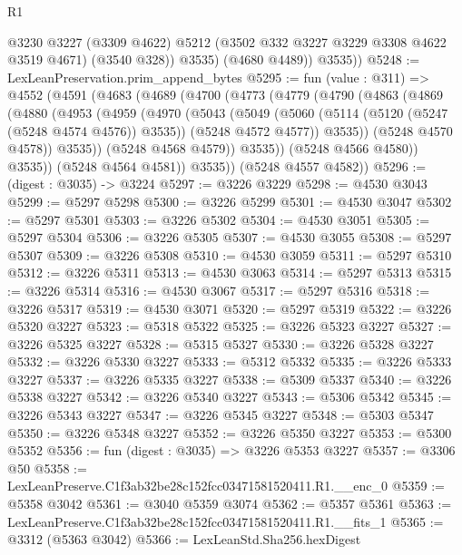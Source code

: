 \begin{lexlean}{R1}
\begin{coremodule}
              @3230
              @3227
              (@3309 @4622)
              @5212
              (@3502 @332 @3227 @3229 @3308 @4622 @3519 @4671)
              (@3540 @328))
            @3535)
          (@4680 @4489))
        @3535))
@5248 := LexLeanPreservation.prim_append_bytes
@5295 := fun (value : @311) =>
  @4552
    (@4591
      (@4683
        (@4689
          (@4700
            (@4773
              (@4779
                (@4790
                  (@4863
                    (@4869
                      (@4880
                        (@4953
                          (@4959
                            (@4970
                              (@5043
                                (@5049
                                  (@5060
                                    (@5114 (@5120 (@5247 (@5248 @4574 @4576)) @3535))
                                    (@5248 @4572 @4577))
                                  @3535))
                              (@5248 @4570 @4578))
                            @3535))
                        (@5248 @4568 @4579))
                      @3535))
                  (@5248 @4566 @4580))
                @3535))
            (@5248 @4564 @4581))
          @3535))
      (@5248 @4557 @4582))
@5296 := (digest : @3035) -> @3224
@5297 := @3226 @3229
@5298 := @4530 @3043
@5299 := @5297 @5298
@5300 := @3226 @5299
@5301 := @4530 @3047
@5302 := @5297 @5301
@5303 := @3226 @5302
@5304 := @4530 @3051
@5305 := @5297 @5304
@5306 := @3226 @5305
@5307 := @4530 @3055
@5308 := @5297 @5307
@5309 := @3226 @5308
@5310 := @4530 @3059
@5311 := @5297 @5310
@5312 := @3226 @5311
@5313 := @4530 @3063
@5314 := @5297 @5313
@5315 := @3226 @5314
@5316 := @4530 @3067
@5317 := @5297 @5316
@5318 := @3226 @5317
@5319 := @4530 @3071
@5320 := @5297 @5319
@5322 := @3226 @5320 @3227
@5323 := @5318 @5322
@5325 := @3226 @5323 @3227
@5327 := @3226 @5325 @3227
@5328 := @5315 @5327
@5330 := @3226 @5328 @3227
@5332 := @3226 @5330 @3227
@5333 := @5312 @5332
@5335 := @3226 @5333 @3227
@5337 := @3226 @5335 @3227
@5338 := @5309 @5337
@5340 := @3226 @5338 @3227
@5342 := @3226 @5340 @3227
@5343 := @5306 @5342
@5345 := @3226 @5343 @3227
@5347 := @3226 @5345 @3227
@5348 := @5303 @5347
@5350 := @3226 @5348 @3227
@5352 := @3226 @5350 @3227
@5353 := @5300 @5352
@5356 := fun (digest : @3035) => @3226 @5353 @3227
@5357 := @3306 @50
@5358 := LexLeanPreserve.C1f3ab32be28c152fcc03471581520411.R1.__enc_0
@5359 := @5358 @3042
@5361 := @3040 @5359 @3074
@5362 := @5357 @5361
@5363 := LexLeanPreserve.C1f3ab32be28c152fcc03471581520411.R1.__fits_1
@5365 := @3312 (@5363 @3042)
@5366 := LexLeanStd.Sha256.hexDigest

\end{coremodule}
\end{lexlean}
